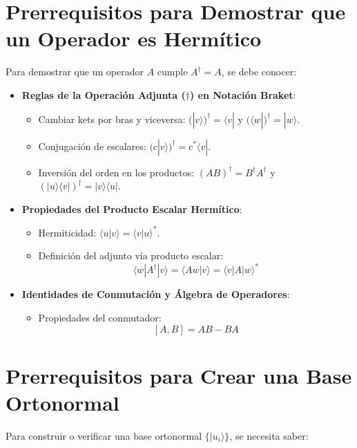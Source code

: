 \documentclass{article}
\begin{document}
\section{Prerrequisitos para Demostrar que un Operador es Hermítico}

Para demostrar que un operador $A$ cumple $A^\dagger = A$, se debe conocer:

\begin{itemize}
    \item \textbf{Reglas de la Operación Adjunta ($\dagger$) en Notación Braket}:
    \begin{itemize}
        \item Cambiar kets por bras y viceversa: $(|v\rangle)^\dagger = \langle v|$ y $(\langle w|)^\dagger = |w\rangle$.
        \item Conjugación de escalares: $(c|v\rangle)^\dagger = c^*\langle v|$.
        \item Inversión del orden en los productos: $(AB)^\dagger = B^\dagger A^\dagger$ y $(|u\rangle\langle v|)^\dagger = |v\rangle\langle u|$.
    \end{itemize}
    \item \textbf{Propiedades del Producto Escalar Hermítico}:
    \begin{itemize}
        \item Hermiticidad: $\langle u|v\rangle = \langle v|u\rangle^*$.
        \item Definición del adjunto vía producto escalar:
        \[
        \langle w|A^\dagger|v\rangle = \langle Aw|v\rangle = \langle v|A|w\rangle^*
        \]
    \end{itemize}
    \item \textbf{Identidades de Conmutación y Álgebra de Operadores}:
    \begin{itemize}
        \item Propiedades del conmutador:
        \[
        [A, B] = AB - BA
        \]
    \end{itemize}
\end{itemize}

\section{Prerrequisitos para Crear una Base Ortonormal}

Para construir o verificar una base ortonormal $\{|u_i\rangle\}$, se necesita saber:
\end{document}
